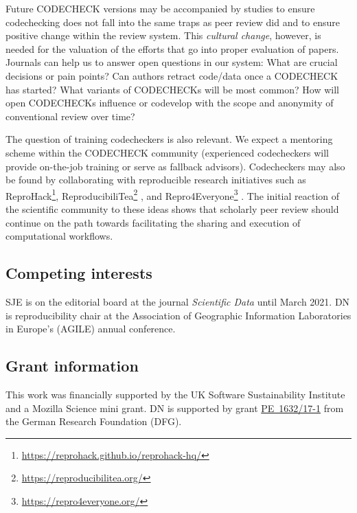 \documentclass[12pt]{article}
\begin{document}
Future CODECHECK versions may be accompanied by studies to ensure
codechecking does not fall into the same traps as peer review did
\cite{tennant_limitations_2020} and to ensure positive change within
the review system.  This \emph{cultural change}, however, is needed
for the valuation of the efforts that go into proper evaluation of
papers.  Journals can help us to answer open questions in our system: What are
crucial decisions or pain points? Can authors retract code/data once a
CODECHECK has started?  What variants of CODECHECKs will be most
common? How will open CODECHECKs influence or codevelop with the scope
and anonymity of conventional review over time?

The question of training codecheckers is also relevant. We expect a
mentoring scheme within the CODECHECK community (experienced
codecheckers will provide on-the-job training or serve as fallback
advisors). Codecheckers may also be found by collaborating with
reproducible research initiatives such as
ReproHack\footnote{\url{https://reprohack.github.io/reprohack-hq/}},
ReproducibiliTea\footnote{\url{https://reproducibilitea.org/}}
\cite{fitzgibbon_brewing_2020}, and
Repro4Everyone\footnote{\url{https://repro4everyone.org/}}
\cite{auer_reproducibility_2020}.  The initial reaction of the
scientific community to these ideas shows that scholarly peer review
should continue on the path towards facilitating the sharing and
execution of computational workflows.

\newpage

\subsection*{Competing interests}


SJE is on the editorial board at the journal \emph{Scientific Data}
until March 2021.  DN is reproducibility chair at the Association of
Geographic Information Laboratories in Europe's (AGILE) annual
conference.

\subsection*{Grant information}

This work was financially supported by the UK Software
Sustainability Institute and a Mozilla Science mini grant.
DN is supported by grant
\href{https://gepris.dfg.de/gepris/projekt/415851837}{PE~1632/17-1}
from the German Research Foundation (DFG).
\end{document}
